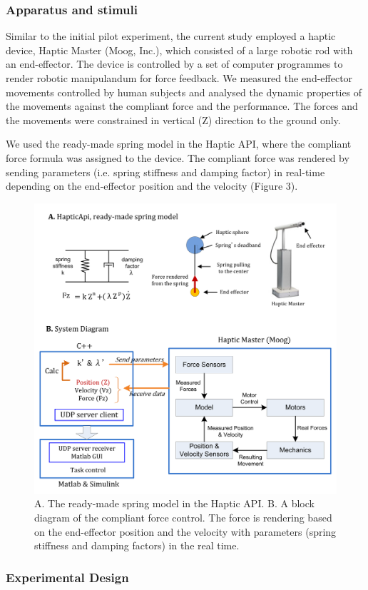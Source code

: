 \subsubsection{Apparatus and stimuli}
Similar to the initial pilot experiment, the current study employed a haptic device, Haptic Master (Moog, Inc.), which consisted of a large robotic rod with an end-effector. The device is controlled by a set of computer programmes to render robotic manipulandum for force feedback. We measured the end-effector movements controlled by human subjects and analysed the dynamic properties of the movements against the compliant force and the performance. The forces and the movements were constrained in vertical (Z) direction to the ground only.

We used the ready-made spring model in the Haptic API, where the compliant force formula was assigned to the device. The compliant force was rendered by sending parameters (i.e. spring stiffness and damping factor) in real-time depending on the end-effector position and the velocity (Figure 3).

%
\begin{figure}
	\centering
	\includegraphics[width=.7\textwidth]{Chie/figs/Figure3.png}
	\caption{A. The ready-made spring model in the Haptic API. B. A block diagram of the compliant force control. The force is rendering based on the end-effector position and the velocity with parameters (spring stiffness and damping factors) in the real time.}
	\label{modelling}
\end{figure}

\subsubsection{Experimental Design}

